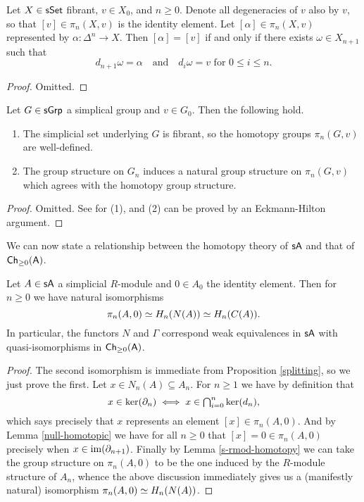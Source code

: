 \begin{lemma}
  \label{null-homotopic}
  Let $X \in \mathsf{s}\mathsf{Set}$ fibrant, $v \in X_0$, and $n \ge 0$. Denote all
  degeneracies of $v$ also by $v$, so that $[v] \in \pi_n(X,v)$ is the
  identity element. Let $[\alpha] \in \pi_n(X,v)$ represented by
  $\alpha : \Delta^n \to X$. Then $[\alpha] = [v]$ if and only if
  there exists $\omega \in X_{n+1}$ such that
  \[
  d_{n+1}\omega = \alpha \quad\text{and}\quad d_i\omega = v\text{ for
  } 0 \le i \le n.
  \]
\end{lemma}

\begin{proof}
  Omitted.
\end{proof}

\begin{lemma}
  \label{s-rmod-homotopy}
  Let $G \in \mathsf{s}\mathsf{Grp}$ a simplical group and $v \in G_0$. Then the
  following hold.
  \begin{enumerate}
  \item The simplicial set underlying $G$ is fibrant, so the homotopy
    groups $\pi_n(G,v)$ are well-defined.
  \item The group structure on $G_n$ induces a natural group structure
    on $\pi_n(G,v)$ which agrees with the homotopy group structure.
  \end{enumerate}
\end{lemma}

\begin{proof}
  Omitted. See \cite{goerssjardine} for (1), and (2) can be proved by
  an Eckmann-Hilton argument.
\end{proof}

We can now state a relationship between the homotopy theory of $\mathsf{s}\mathsf{A}$
and that of $\mathsf{Ch}_{\ge 0}(\mathsf{A})$.

\begin{proposition}
  \label{homotopy-homology}
  Let $A \in \mathsf{s}\mathsf{A}$ a simplicial $R$-module and $0 \in A_0$ the
  identity element. Then for $n \ge 0$ we have natural isomorphisms
  \[
  \pi_n(A,0) \simeq H_n(N(A)) \simeq H_n(C(A)).
  \]
  In particular, the functors $N$ and $\Gamma$ correspond weak
  equivalences in $\mathsf{s}\mathsf{A}$ with quasi-isomorphisms in $\mathsf{Ch}_{\ge 0}(\mathsf{A})$.
\end{proposition}

\begin{proof}
  The second isomorphism is immediate from Proposition
  \ref{splitting}, so we just prove the first. Let $x \in N_n(A)
  \subseteq A_n$. For $n \ge 1$ we have by definition that
  \[
  \textstyle{x \in \ker(\partial_n) \iff x \in \bigcap_{i=0}^n \ker(d_n)},
  \]
  which says precisely that $x$ represents an element $[x] \in
  \pi_n(A,0)$. And by Lemma \ref{null-homotopic} we have for all $n
  \ge 0$ that $[x] = 0 \in \pi_n(A,0)$ precisely when $x \in
  \operatorname{im}(\partial_{n+1})$. Finally by Lemma \ref{s-rmod-homotopy} we can take
  the group structure on $\pi_n(A,0)$ to be the one induced by the
  $R$-module structure of $A_n$, whence the above discussion
  immediately gives us a (manifestly natural) isomorphism $\pi_n(A,0)
  \simeq H_n(N(A))$.
\end{proof}

